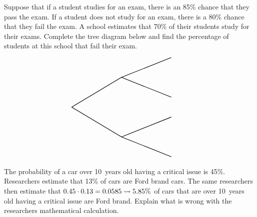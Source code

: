 \documentclass[12pt,letterpaper]{exam}
\begin{document}
\begin{questions}
\[\begin{tikzpicture}
	\node at (3.2,5.3) {};
	\node at (5.7,5.3) {}; 
	
	\node at (2.5,3) {};
	\node at (4.5,3) {};
	\node at (6.5,3) {};
	\node at (8,1) {};
	\end{tikzpicture}
	\]



\newpage
\question[10] Suppose that if a student studies for an exam, there is an 85\% chance that they pass the exam. If a student does not study for an exam, there is a 80\% chance that they fail the exam. A school estimates that 70\% of their students study for their exams. Complete the tree diagram below and find the percentage of students at this school that fail their exam. 
	\[
	\begin{tikzpicture}[scale= 1.0]
	\def\FirstUpLabel{}
	\def\FirstDownLabel{}
	\def\SecondUpLabel{}
	\def\SecondDownLabel{}
	\def\Up{$$}
	\def\Down{$$}
	\def\UpUp{$$}
	\def\UpDown{$$}
	\def\DownUp{$$}
	\def\DownDown{$$}
	\def\first{$$}
	\def\second{$$}
	\def\third{$$}
	\def\fourth{$$}
		
	\node at (1,1) {\FirstUpLabel};	
	\node at (1,-1) {\FirstDownLabel};	
	\node at (1.8,0.6) {\Up};
	\node at (1.8,-0.6) {\Down};
	\draw[thick] (0,0) -- (2.5,1.5);
	\draw[thick] (0,0) -- (2.5,-1.5);
		
	\node at (3.75,2.3) {\SecondUpLabel};
	\node at (3.75,0.7) {\SecondDownLabel};
	\node at (4,1.8) {\UpUp};
	\node at (4.1,1.2) {\UpDown};
	\node at (5.75,2.5) {\first};
	\node at (5.75,0.5) {\second};
	\draw[thick] (2.5,1.5) -- (5,2.5);
	\draw[thick] (2.5,1.5) -- (5,0.5);

	\node at (3.75,-0.7) {\SecondUpLabel};
	\node at (3.75,-2.3) {\SecondDownLabel};
	\node at (4.1,-1.2) {\DownUp};
	\node at (4.1,-1.8) {\DownDown};
	\node at (5.75,-0.5) {\third};	
	\node at (5.75,-2.5) {\fourth};	
	\draw[thick] (2.5,-1.5) -- (5,-0.5);
	\draw[thick] (2.5,-1.5) -- (5,-2.5);
	\end{tikzpicture}
	\] \pspace



\newpage
\question[10] The probability of a car over 10~years old having a critical issue is 45\%. Researchers estimate that 13\% of cars are Ford brand cars. The same researchers then estimate that $0.45 \cdot 0.13= 0.0585 \rightsquigarrow 5.85\%$ of cars that are over 10~years old having a critical issue are Ford brand. Explain what is wrong with the researchers mathematical calculation. 


\end{questions}
\end{document}
